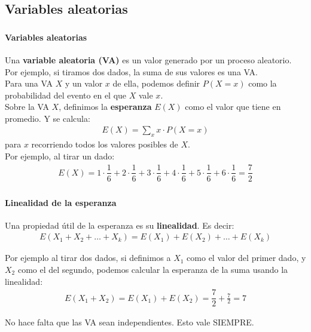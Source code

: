 \documentclass{beamer}
\begin{document}
\subsection{Variables aleatorias}

\begin{frame}
  \frametitle{\SECTIONA}
  \framesubtitle{Variables aleatorias}

  Una \textbf{variable aleatoria (VA)} es un valor generado por un proceso aleatorio. Por ejemplo, si tiramos dos dados, la suma de sus valores es una VA. \\
  Para una VA \(X\) y un valor \(x\) de ella, podemos definir \(P(X = x)\) como la probabilidad del evento en el que \(X\) vale \(x\). \pause \\

  Sobre la VA \(X\), definimos la \textbf{esperanza} \(E(X)\) como el valor que tiene en promedio. Y se calcula:
  \begin{gather*}
    E(X) = \sum_{x}x \cdot P(X = x)
  \end{gather*}
  para \(x\) recorriendo todos los valores posibles de \(X\). \pause \\
  Por ejemplo, al tirar un dado:
  \begin{gather*}
    E(X) = 1 \cdot \dfrac{1}{6} + 2 \cdot \dfrac{1}{6} + 3 \cdot \dfrac{1}{6} + 4 \cdot \dfrac{1}{6} + 5 \cdot \dfrac{1}{6} + 6 \cdot \dfrac{1}{6} = \dfrac{7}{2}
  \end{gather*}
\end{frame}

\begin{frame}
  \frametitle{\SECTIONA}
  \framesubtitle{Linealidad de la esperanza}

  Una propiedad útil de la esperanza es su \textbf{linealidad}. Es decir:
  \begin{gather*}
    E(X_{1} + X_{2} + \ldots + X_{k}) = E(X_{1}) + E(X_{2}) + \ldots + E(X_{k})
  \end{gather*} \pause

  Por ejemplo al tirar dos dados, si definimos a \(X_{1}\) como el valor del primer dado, y \(X_{2}\) como el del segundo, podemos calcular la esperanza de la suma usando la linealidad:
  \begin{gather*}
    E(X_{1} + X_{2}) = E(X_{1}) + E(X_{2}) = \dfrac{7}{2} + \frac{7}{2} = 7
  \end{gather*} \pause

  No hace falta que las VA sean independientes. Esto vale SIEMPRE.
\end{frame}
\end{document}
